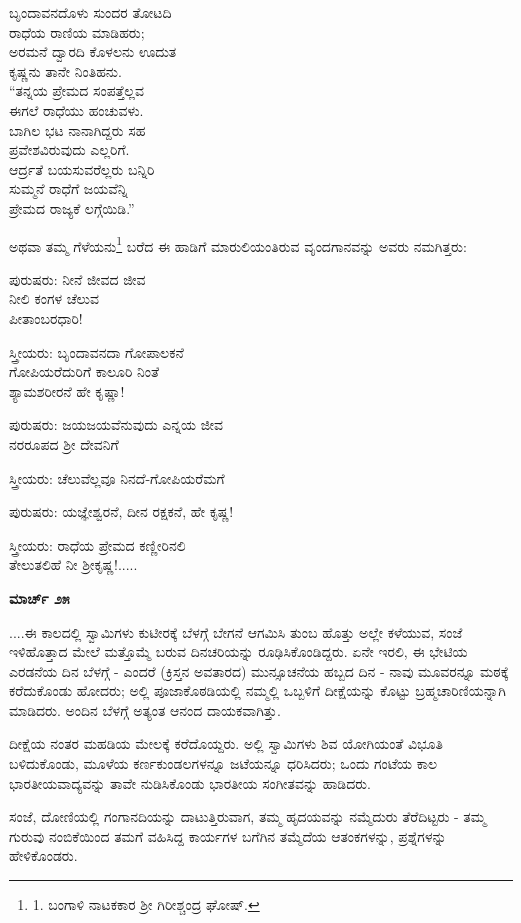 \begin{myquote}
ಬೃಂದಾವನದೊಳು ಸುಂದರ ತೋಟದಿ\\ರಾಧೆಯ ರಾಣಿಯ ಮಾಡಿಹರು;\\ಅರಮನೆ ದ್ವಾರದಿ ಕೊಳಲನು ಊದುತ\\ಕೃಷ್ಣನು ತಾನೇ ನಿಂತಿಹನು.\\“ತನ್ನಯ ಪ್ರೇಮದ ಸಂಪತ್ತೆಲ್ಲವ\\ಈಗಲೆ ರಾಧೆಯು ಹಂಚುವಳು.\\ಬಾಗಿಲ ಭಟ ನಾನಾಗಿದ್ದರು ಸಹ\\ಪ್ರವೇಶವಿರುವುದು ಎಲ್ಲರಿಗೆ.\\ಆರ್ದ್ರತೆ ಬಯಸುವರೆಲ್ಲರು ಬನ್ನಿರಿ\\ಸುಮ್ಮನೆ ರಾಧೆಗೆ ಜಯವೆನ್ನಿ\\ಪ್ರೇಮದ ರಾಜ್ಯಕೆ ಲಗ್ಗೆಯಿಡಿ.”
\end{myquote}

ಅಥವಾ ತಮ್ಮ ಗೆಳೆಯನು\footnote{1. ಬಂಗಾಳಿ ನಾಟಕಕಾರ ಶ‍್ರೀ ಗಿರೀಶ್ಚಂದ್ರ ಘೋಷ್.} ಬರೆದ ಈ ಹಾಡಿಗೆ ಮಾರುಲಿಯಂತಿರುವ ವೃಂದಗಾನವನ್ನು ಅವರು ನಮಗಿತ್ತರು:

ಪುರುಷರು: ನೀನೆ ಜೀವದ ಜೀವ\\ನೀಲಿ ಕಂಗಳ ಚೆಲುವ\\ಪೀತಾಂಬರಧಾರಿ!

ಸ್ತ್ರೀಯರು: ಬೃಂದಾವನದಾ ಗೋಪಾಲಕನೆ\\ಗೋಪಿಯರೆದುರಿಗೆ ಕಾಲೂರಿ ನಿಂತೆ\\ಶ್ಯಾಮಶರೀರನೆ ಹೇ ಕೃಷ್ಣಾ!

ಪುರುಷರು: ಜಯಜಯವೆನುವುದು ಎನ್ನಯ ಜೀವ\\ನರರೂಪದ ಶ‍್ರೀ ದೇವನಿಗೆ

ಸ್ತ್ರೀಯರು: ಚೆಲುವೆಲ್ಲವೂ ನಿನದೆ-ಗೋಪಿಯರೆಮಗೆ

ಪುರುಷರು: ಯಜ್ಞೇಶ್ವರನೆ, ದೀನ ರಕ್ಷಕನೆ, ಹೇ ಕೃಷ್ಣ!

ಸ್ತ್ರೀಯರು: ರಾಧೆಯ ಪ್ರೇಮದ ಕಣ್ಣೀರಿನಲಿ\\ತೇಲುತಲಿಹೆ ನೀ ಶ‍್ರೀಕೃಷ್ಣ!.....

\textbf{ಮಾರ್ಚ್ ೨೫}

....ಈ ಕಾಲದಲ್ಲಿ ಸ್ವಾಮಿಗಳು ಕುಟೀರಕ್ಕೆ ಬೆಳಗ್ಗೆ ಬೇಗನೆ ಆಗಮಿಸಿ ತುಂಬ ಹೊತ್ತು ಅಲ್ಲೇ ಕಳೆಯುವ, ಸಂಜೆ ಇಳಿಹೊತ್ತಾದ ಮೇಲೆ ಮತ್ತೊಮ್ಮೆ ಬರುವ ದಿನಚರಿಯನ್ನು ರೂಢಿಸಿಕೊಂಡಿದ್ದರು. ಏನೇ ಇರಲಿ, ಈ ಭೇಟಿಯ ಎರಡನೆಯ ದಿನ ಬೆಳಗ್ಗೆ - ಎಂದರೆ (ಕ್ರಿಸ್ತನ ಅವತಾರದ) ಮುನ್ಸೂಚನೆಯ ಹಬ್ಬದ ದಿನ - ನಾವು ಮೂವರನ್ನೂ ಮಠಕ್ಕೆ ಕರೆದುಕೊಂಡು ಹೋದರು; ಅಲ್ಲಿ ಪೂಜಾಕೊಠಡಿಯಲ್ಲಿ ನಮ್ಮಲ್ಲಿ ಒಬ್ಬಳಿಗೆ ದೀಕ್ಷೆಯನ್ನು ಕೊಟ್ಟು ಬ್ರಹ್ಮಚಾರಿಣಿಯನ್ನಾಗಿ ಮಾಡಿದರು. ಅಂದಿನ ಬೆಳಗ್ಗೆ ಅತ್ಯಂತ ಆನಂದ ದಾಯಕವಾಗಿತ್ತು.

ದೀಕ್ಷೆಯ ನಂತರ ಮಹಡಿಯ ಮೇಲಕ್ಕೆ ಕರೆದೊಯ್ದರು. ಅಲ್ಲಿ ಸ್ವಾಮಿಗಳು ಶಿವ ಯೋಗಿಯಂತೆ ವಿಭೂತಿ ಬಳಿದುಕೊಂಡು, ಮೂಳೆಯ ಕರ್ಣಕುಂಡಲಗಳನ್ನೂ ಜಟೆಯನ್ನೂ ಧರಿಸಿದರು; ಒಂದು ಗಂಟೆಯ ಕಾಲ ಭಾರತೀಯವಾದ್ಯವನ್ನು ತಾವೇ ನುಡಿಸಿಕೊಂಡು ಭಾರತೀಯ ಸಂಗೀತವನ್ನು ಹಾಡಿದರು.

ಸಂಜೆ, ದೋಣಿಯಲ್ಲಿ ಗಂಗಾನದಿಯನ್ನು ದಾಟುತ್ತಿರುವಾಗ, ತಮ್ಮ ಹೃದಯವನ್ನು ನಮ್ಮೆದುರು ತೆರೆದಿಟ್ಟರು - ತಮ್ಮ ಗುರುವು ನಂಬಿಕೆಯಿಂದ ತಮಗೆ ವಹಿಸಿದ್ದ ಕಾರ್ಯಗಳ ಬಗೆಗಿನ ತಮ್ಮೆದೆಯ ಆತಂಕಗಳನ್ನು, ಪ್ರಶ್ನೆಗಳನ್ನು ಹೇಳಿಕೊಂಡರು.

